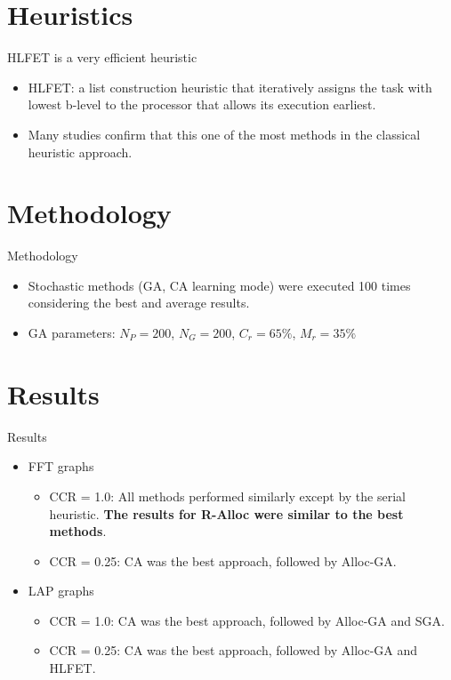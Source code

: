 \documentclass{beamer}
\begin{document}
\section{Heuristics}
\begin{frame}{HLFET is a very efficient heuristic}
\begin{itemize}
\item HLFET: a list construction heuristic that iteratively assigns the task with lowest b-level to the processor that allows its execution earliest.
\item Many studies confirm that this one of the most methods in the classical heuristic approach.
\end{itemize}
\end{frame}


\section{Methodology}
\begin{frame}{Methodology}
\begin{itemize}
\item Stochastic methods (GA, CA learning mode) were executed 100 times considering the best and average results.
\item GA parameters: $N_P = 200$, $N_G = 200$, $C_r = 65\%$, $M_r = 35\%$
\end{itemize}
\end{frame}

\section{Results}

\begin{frame}{Results}
\begin{itemize}
\item FFT graphs
	\begin{itemize}
	\item CCR = 1.0: All methods performed similarly except by the serial heuristic. \textbf{The results for R-Alloc were similar to the best methods}. 
    \item CCR = 0.25: CA was the best approach, followed by Alloc-GA.
	\end{itemize}
\item LAP graphs
	\begin{itemize}
	\item CCR = 1.0: CA was the best approach, followed by Alloc-GA and SGA.
    \item CCR = 0.25: CA was the best approach, followed by Alloc-GA and HLFET.
	\end{itemize}
\end{itemize}
\end{frame}
\end{document}
